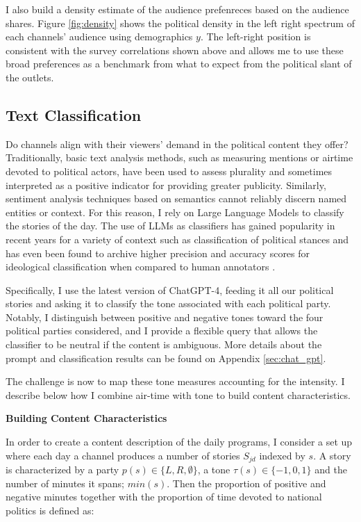 \documentclass[12pt]{article}
\begin{document}
	I also build a density estimate of the audience prefenreces based on the audience shares.	Figure \ref{fig:density} shows the political density in the left right spectrum of each channels' audience using demographics $y$. The left-right position is consistent with the survey correlations shown above and allows me to use these broad preferences as a benchmark from what to expect from the political slant of the outlets. 
	
	
	
	\subsection*{Text Classification}
	
	
	Do channels align with their viewers' demand in the political content they offer? Traditionally, basic text analysis methods, such as measuring mentions or airtime devoted to political actors, have been used to assess plurality and sometimes interpreted as a positive indicator for providing greater publicity. Similarly, sentiment analysis techniques based on semantics cannot reliably discern named entities or context. For this reason, I rely on Large Language Models to classify the stories of the day. The use of LLMs as classifiers has gained popularity in recent years for a variety of context such as classification of political stances \citep{lemens} and has even been found to archive higher precision and accuracy scores for ideological classification when compared to human annotators \citep{tornberg2023}.
	
	
	
	Specifically, I use the latest version of ChatGPT-4, feeding it all our political stories and asking it to classify the tone associated with each political party. Notably, I distinguish between positive and negative tones toward the four political parties considered, and I provide a flexible query that allows the classifier to be neutral if the content is ambiguous. More details about the prompt and classification results can be found on Appendix \ref{sec:chat_gpt}.
	


The challenge is now to map these tone measures accounting for the intensity. I describe below how I combine air-time with tone to build content characteristics. 
	
	
	
	
	\textbf{Building Content Characteristics}
	
	
	In order to create a content description of the daily programs, I consider a set up where each day a channel produces a number of stories $S_{jd}$ indexed by $s$. A story is characterized by a party $ p(s) \in \{L, R, \emptyset\} $, a tone $ \tau(s) \in \{-1, 0, 1\} $ and the number of minutes it spans; $min(s)$. Then the proportion of positive and negative minutes together with the proportion of time devoted to national politics is defined as: 
	
\end{document}
